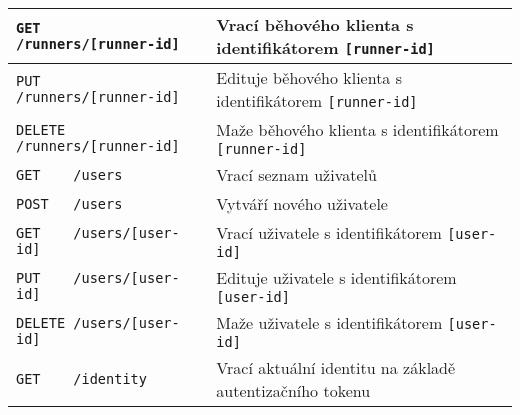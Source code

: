 \begin{sidewaystable}[h]
\begin{tabular}{|l|l|}
\verb|GET    /runners/[runner-id]|                       & Vrací běhového klienta s identifikátorem \verb|[runner-id]| \\ \hline
\verb|PUT    /runners/[runner-id]|                       & Edituje běhového klienta s identifikátorem \verb|[runner-id]| \\ \hline
\verb|DELETE /runners/[runner-id]|                       & Maže běhového klienta s identifikátorem \verb|[runner-id]| \\ \hline
\verb|GET    /users|                                     & Vrací seznam uživatelů \\ \hline
\verb|POST   /users|                                     & Vytváří nového uživatele \\ \hline
\verb|GET    /users/[user-id]|                           & Vrací uživatele s identifikátorem \verb|[user-id]| \\ \hline
\verb|PUT    /users/[user-id]|                           & Edituje uživatele s identifikátorem \verb|[user-id]| \\ \hline
\verb|DELETE /users/[user-id]|                           & Maže uživatele s identifikátorem \verb|[user-id]| \\ \hline
\verb|GET    /identity|                                  & Vrací aktuální identitu na základě autentizačního tokenu \\ \hline
\end{tabular}
\end{sidewaystable}

